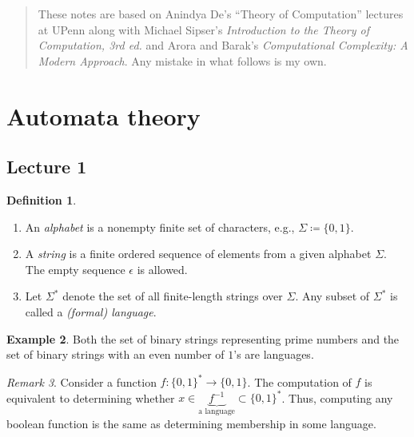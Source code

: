 \documentclass[10pt,letterpaper,cm]{nupset}
\theoremstyle{definition}
\newtheorem{definition}{Definition}[subsection]
\newtheorem{exmp}[definition]{Example}
\theoremstyle{theorem}
\theoremstyle{remark}
\newtheorem{remark}[definition]{Remark}
\newcommand{\1}{\mathbf{1}}
\newcommand{\0}{\vec 0}
\begin{document}
\begin{abstract}
These notes are based on Anindya De's ``Theory of Computation'' lectures at UPenn along with Michael Sipser's \textit{Introduction to the Theory of Computation, 3rd ed.} and Arora and Barak's \textit{Computational Complexity: A Modern Approach}. Any mistake in what follows is my own.
\end{abstract}

\tableofcontents
\newpage

\section{Automata theory}

\subsection{Lecture 1}

\begin{definition} $ $
\begin{enumerate}
\item An \textit{alphabet} is a nonempty finite set of characters, e.g., $\Sigma \coloneqq \{0,1\}$. 
\item A \textit{string} is a finite ordered sequence of elements from a given alphabet $\Sigma$. The empty sequence $\epsilon$ is allowed.
\item Let $\Sigma^{\ast}$ denote the set of all finite-length strings over $\Sigma$. Any subset of $\Sigma^{\ast}$ is called a \textit{(formal) language}.
\end{enumerate}
\end{definition}

\begin{exmp}
Both the set of binary strings representing prime numbers and the set of binary strings with an even number of $1$'s are languages. 
\end{exmp}

\begin{remark}
Consider a function $f: \{0,1\}^{\ast} \to \{0,1\}$. The computation of $f$ is equivalent to determining whether $x\in \underbrace{f^{-1}}_{\text{a language}} \subset \{0,1\}^{\ast}$. Thus, computing any boolean function is the same as determining membership in some language.
\end{remark}
\end{document}
